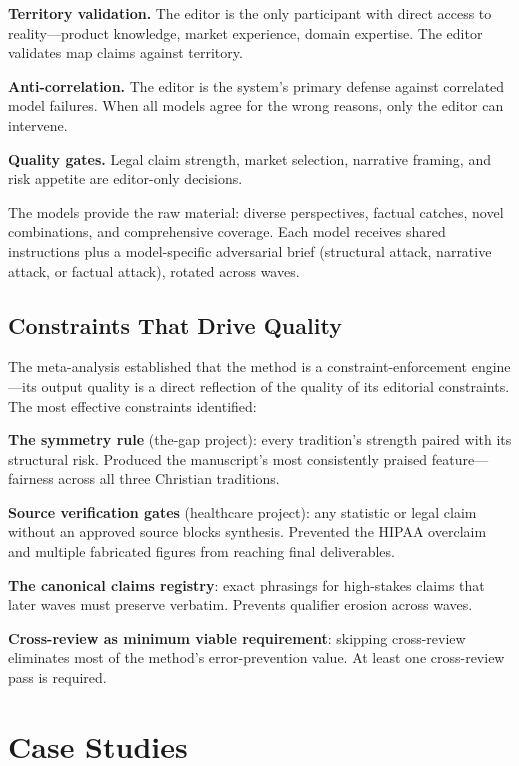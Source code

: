\documentclass[11pt,letterpaper]{article}
\begin{document}
\textbf{Territory validation.} The editor is the only participant with direct access to reality---product knowledge, market experience, domain expertise. The editor validates map claims against territory.

\textbf{Anti-correlation.} The editor is the system's primary defense against correlated model failures. When all models agree for the wrong reasons, only the editor can intervene.

\textbf{Quality gates.} Legal claim strength, market selection, narrative framing, and risk appetite are editor-only decisions.

The models provide the raw material: diverse perspectives, factual catches, novel combinations, and comprehensive coverage. Each model receives shared instructions plus a model-specific adversarial brief (structural attack, narrative attack, or factual attack), rotated across waves.

\subsection{Constraints That Drive Quality}

The meta-analysis established that the method is a constraint-enforcement engine---its output quality is a direct reflection of the quality of its editorial constraints. The most effective constraints identified:

\textbf{The symmetry rule} (the-gap project): every tradition's strength paired with its structural risk. Produced the manuscript's most consistently praised feature---fairness across all three Christian traditions.

\textbf{Source verification gates} (healthcare project): any statistic or legal claim without an approved source blocks synthesis. Prevented the HIPAA overclaim and multiple fabricated figures from reaching final deliverables.

\textbf{The canonical claims registry}: exact phrasings for high-stakes claims that later waves must preserve verbatim. Prevents qualifier erosion across waves.

\textbf{Cross-review as minimum viable requirement}: skipping cross-review eliminates most of the method's error-prevention value. At least one cross-review pass is required.

\section{Case Studies}
\end{document}
